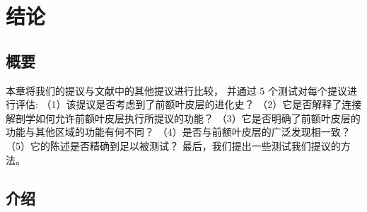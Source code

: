 \chapter{结论} \label{chap:chap10}

\section{概要}
本章将我们的提议与文献中的其他提议进行比较，
并通过 5 个测试对每个提议进行评估:
（1）该提议是否考虑到了前额叶皮层的进化史？
（2）它是否解释了连接解剖学如何允许前额叶皮层执行所提议的功能？
（3）它是否明确了前额叶皮层的功能与其他区域的功能有何不同？
（4）是否与前额叶皮层的广泛发现相一致？
（5）它的陈述是否精确到足以被测试？
最后，我们提出一些测试我们提议的方法。


\section{介绍}

